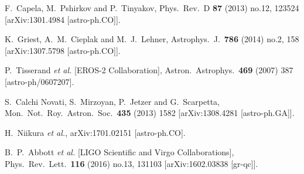 \begin{thebibliography}{10}
  F.~Capela, M.~Pshirkov and P.~Tinyakov,
  Phys.\ Rev.\ D {\bf 87} (2013) no.12,  123524
  [arXiv:1301.4984 [astro-ph.CO]].


  K.~Griest, A.~M.~Cieplak and M.~J.~Lehner,
  Astrophys.\ J.\  {\bf 786} (2014) no.2,  158
  [arXiv:1307.5798 [astro-ph.CO]].


  P.~Tisserand {\it et al.} [EROS-2 Collaboration],
  Astron.\ Astrophys.\  {\bf 469} (2007) 387
  [astro-ph/0607207].


  S.~Calchi Novati, S.~Mirzoyan, P.~Jetzer and G.~Scarpetta,
  Mon.\ Not.\ Roy.\ Astron.\ Soc.\  {\bf 435} (2013) 1582
  [arXiv:1308.4281 [astro-ph.GA]].

  H.~Niikura {\it et al.},
  arXiv:1701.02151 [astro-ph.CO].


  B.~P.~Abbott {\it et al.} [LIGO Scientific and Virgo Collaborations],
  Phys.\ Rev.\ Lett.\  {\bf 116} (2016) no.13,  131103
  [arXiv:1602.03838 [gr-qc]].



\end{thebibliography}
